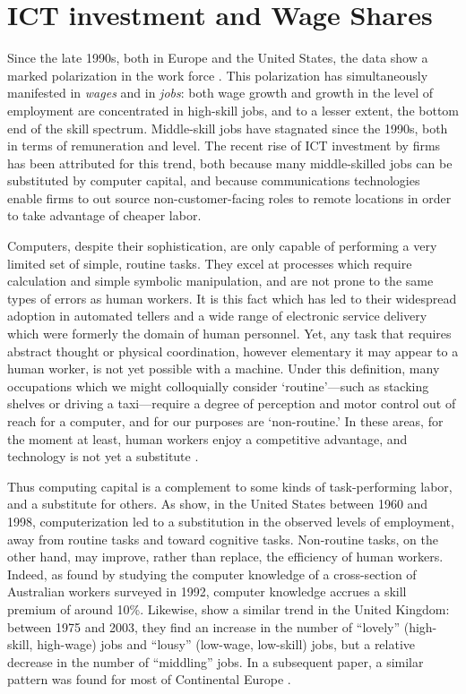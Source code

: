 \chapter{ICT investment and Wage Shares}





Since the late 1990s, both in Europe and the United States, the data show a marked polarization in the work force \citep{Goos2007, Autor2006}. This polarization has simultaneously manifested in \emph{wages} and in \emph{jobs}: both wage growth and growth in the level of employment are concentrated in high-skill jobs, and to a lesser extent, the bottom end of the skill spectrum. Middle-skill jobs have stagnated since the 1990s, both in terms of remuneration and level. The recent rise of ICT investment by firms has been attributed for this trend, both because many middle-skilled jobs can be substituted by computer capital, and because communications technologies enable firms to out source non-customer-facing roles to remote locations in order to take advantage of cheaper labor.

Computers, despite their sophistication, are only capable of performing a very limited set of simple, routine tasks. They excel at processes which require calculation and simple symbolic manipulation, and are not prone to the same types of errors as human workers. It is this fact which has led to their widespread adoption in automated tellers and a wide range of electronic service delivery which were formerly the domain of human personnel. Yet, any task that requires abstract thought or physical coordination, however elementary it may appear to a human worker, is not yet possible with a machine. Under this definition, many occupations which we might colloquially consider `routine'---such as stacking shelves or driving a taxi---require a degree of perception and motor control out of reach for a computer, and for our purposes are `non-routine.' In these areas, for the moment at least, human workers enjoy a competitive advantage, and technology is not yet a substitute \citep{Levy2003}.

Thus computing capital is a complement to some kinds of task-performing labor, and a substitute for others. As \citet{Levy2003} show, in the United States between 1960 and 1998, computerization led to a substitution in the observed levels of employment, away from routine tasks and toward cognitive tasks. Non-routine tasks, on the other hand, may improve, rather than replace, the efficiency of human workers. Indeed, as \citet{Borland2004} found by studying the computer knowledge of a cross-section of Australian workers surveyed in 1992, computer knowledge accrues a skill premium of around 10\%. Likewise, \citet{Goos2007} show a similar trend in the United Kingdom: between 1975 and 2003, they find an increase in the number of ``lovely'' (high-skill, high-wage) jobs and ``lousy'' (low-wage, low-skill) jobs, but a relative decrease in the number of ``middling'' jobs. In a subsequent paper, a similar pattern was found for most of Continental Europe \citep{Goos2009}.

